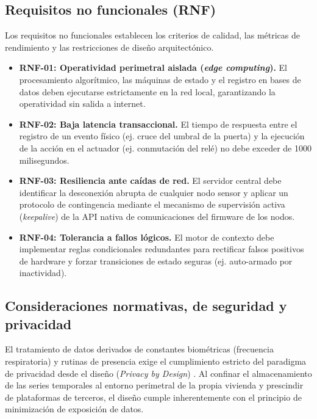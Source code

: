 \subsection{Requisitos no funcionales (RNF)}
Los requisitos no funcionales establecen los criterios de calidad, las métricas de rendimiento y las restricciones de diseño arquitectónico.
\begin{itemize}
    \item \textbf{RNF-01: Operatividad perimetral aislada (\textit{edge computing}).} El procesamiento algorítmico, las máquinas de estado y el registro en bases de datos deben ejecutarse estrictamente en la red local, garantizando la operatividad sin salida a internet.
    \item \textbf{RNF-02: Baja latencia transaccional.} El tiempo de respuesta entre el registro de un evento físico (ej. cruce del umbral de la puerta) y la ejecución de la acción en el actuador (ej. conmutación del relé) no debe exceder de 1000 milisegundos.
    \item \textbf{RNF-03: Resiliencia ante caídas de red.} El servidor central debe identificar la desconexión abrupta de cualquier nodo sensor y aplicar un protocolo de contingencia mediante el mecanismo de supervisión activa (\textit{keepalive}) de la API nativa de comunicaciones del firmware de los nodos.
    \item \textbf{RNF-04: Tolerancia a fallos lógicos.} El motor de contexto debe implementar reglas condicionales redundantes para rectificar falsos positivos de hardware y forzar transiciones de estado seguras (ej. auto-armado por inactividad).
\end{itemize}

\subsection{Consideraciones normativas, de seguridad y privacidad}
El tratamiento de datos derivados de constantes biométricas (frecuencia respiratoria) y rutinas de presencia exige el cumplimiento estricto del paradigma de privacidad desde el diseño (\textit{Privacy by Design}) \cite{cavoukian2009privacy}. Al confinar el almacenamiento de las series temporales al entorno perimetral de la propia vivienda y prescindir de plataformas de terceros, el diseño cumple inherentemente con el principio de minimización de exposición de datos. 

